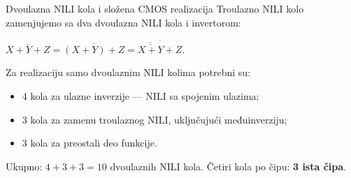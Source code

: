 \begin{frame}[label=02-s049b]{Dvoulazna NILI kola i složena CMOS realizacija}
\setlength{\parskip}{0pt}
Troulazno NILI kolo zamenjujemo sa dva dvoulazna NILI kola i invertorom:
\par\vspace{2mm}
{\centering\(\displaystyle\overline{X+Y+Z}=\overline{(X+Y)+Z}
=\overline{\overline{\overline{X+Y}}+Z}.\)\par}
\par\vspace{3mm}
Za realizaciju samo dvoulaznim NILI kolima potrebni su:
\begin{itemize}
\item 4 kola za ulazne inverzije — NILI sa spojenim ulazima;
\item 3 kola za zamenu troulaznog NILI, uključujući međuinverziju;
\item 3 kola za preostali deo funkcije.
\end{itemize}
Ukupno: \(4+3+3=10\) dvoulaznih NILI kola. Četiri kola po čipu: \textbf{3 ista čipa}.
\par\vspace{3mm}
\end{frame}
